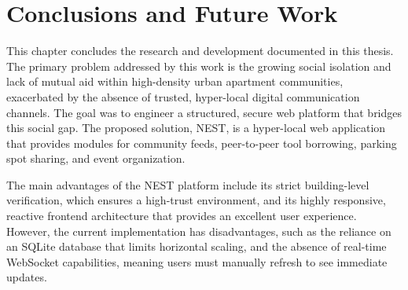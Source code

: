 \chapter{Conclusions and Future Work}
\label{chap:conclusions-future-work}

This chapter concludes the research and development documented in this thesis. The primary problem addressed by this work is the growing social isolation and lack of mutual aid within high-density urban apartment communities, exacerbated by the absence of trusted, hyper-local digital communication channels. The goal was to engineer a structured, secure web platform that bridges this social gap. The proposed solution, NEST, is a hyper-local web application that provides modules for community feeds, peer-to-peer tool borrowing, parking spot sharing, and event organization. 

The main advantages of the NEST platform include its strict building-level verification, which ensures a high-trust environment, and its highly responsive, reactive frontend architecture that provides an excellent user experience. However, the current implementation has disadvantages, such as the reliance on an SQLite database that limits horizontal scaling, and the absence of real-time WebSocket capabilities, meaning users must manually refresh to see immediate updates.

